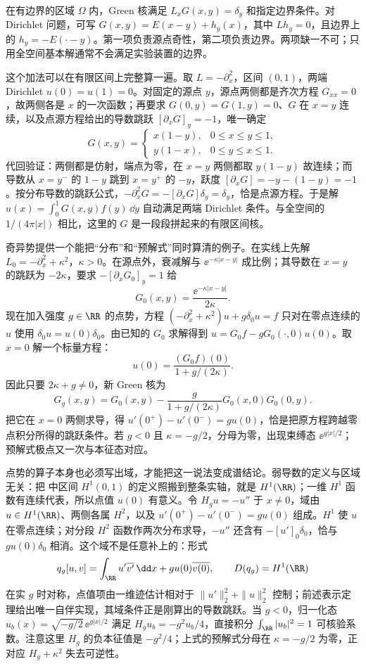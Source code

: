 在有边界的区域 \(\Omega\) 内，Green 核满足 \(L_xG(x,y)=\delta_y\) 和指定边界条件。对 Dirichlet 问题，可写 \(G(x,y)=E(x-y)+h_y(x)\)，其中 \(Lh_y=0\)，且边界上的 \(h_y=-E(\cdot-y)\)。第一项负责源点奇性，第二项负责边界。两项缺一不可；只用全空间基本解通常不会满足实验装置的边界。

这个加法可以在有限区间上完整算一遍。取 \(L=-\partial_x^2\)，区间 \((0,1)\)，两端 Dirichlet \(u(0)=u(1)=0\)。对固定的源点 \(y\)，源点两侧都是齐次方程 \(G_{xx}=0\)，故两侧各是 \(x\) 的一次函数；再要求 \(G(0,y)=G(1,y)=0\)、$G$ 在 $x=y$ 连续，以及点源方程给出的导数跳跃 $[\partial_xG]_y=-1$，唯一确定
\begin{equation}
 G(x,y)=
 \begin{cases}
 x(1-y),&0\le x\le y\le1,\\
 y(1-x),&0\le y\le x\le1.
 \end{cases}
 \label{eq:math-dirichlet-green-01}
\end{equation}
代回验证：两侧都是仿射，端点为零，在 \(x=y\) 两侧都取 \(y(1-y)\) 故连续；而导数从 \(x=y^{-}\) 的 \(1-y\) 跳到 \(x=y^{+}\) 的 \(-y\)，跃度 \([\partial_xG]=-y-(1-y)=-1\)。按分布导数的跳跃公式，\(-\partial_x^2G=-[\partial_xG]\delta_y=\delta_y\)，恰是点源方程。于是解 \(u(x)=\int_0^1G(x,y)f(y)\,\dd y\) 自动满足两端 Dirichlet 条件。与全空间的 \(1/(4\pi|x|)\) 相比，这里的 \(G\) 是一段段拼起来的有限区间核。

奇异势提供一个能把“分布”和“预解式”同时算清的例子。在实线上先解 \(L_0=-\partial_x^2+\kappa^2\)，\(\kappa>0\)。在源点外，衰减解与 \(\ee^{-\kappa|x-y|}\) 成比例；其导数在 \(x=y\) 的跳跃为 \(-2\kappa\)，要求 \(-[\partial_xG_0]_{y}=1\) 给
\[
G_0(x,y)=\frac{\ee^{-\kappa|x-y|}}{2\kappa}.
\]
现在加入强度 \(g\in\RR\) 的点势，方程 \((-\partial_x^2+\kappa^2)u+g\delta_0u=f\) 只对在零点连续的 \(u\) 使用 \(\delta_0u=u(0)\delta_0\)。由已知的 \(G_0\) 求解得到 \(u=G_0f-gG_0(\cdot,0)u(0)\)。取 \(x=0\) 解一个标量方程：
\[
u(0)=\frac{(G_0f)(0)}{1+g/(2\kappa)}.
\]
因此只要 \(2\kappa+g\ne0\)，新 Green 核为
\[
G_g(x,y)=G_0(x,y)-\frac{g}{1+g/(2\kappa)}G_0(x,0)G_0(0,y).
\]
把它在 \(x=0\) 两侧求导，得 \(u'(0^+)-u'(0^-)=g u(0)\)，恰是把原方程跨越零点积分所得的跳跃条件。若 \(g<0\) 且 \(\kappa=-g/2\)，分母为零，出现束缚态 \(\ee^{g|x|/2}\)；预解式极点又一次与本征态对应。

点势的算子本身也必须写出域，才能把这一说法变成谱结论。弱导数的定义与区域无关：把 中区间 \(H^1(0,1)\) 的定义照搬到整条实轴，就是 \(H^1(\RR)\)；一维 \(H^1\) 函数有连续代表，所以点值 \(u(0)\) 有意义。令 \(H_g u=-u''\) 于 \(x\ne0\)，域由 \(u\in H^1(\RR)\)、两侧各属 \(H^2\)，以及 \(u'(0^+)-u'(0^-)=g u(0)\) 组成。\(H^1\) 使 \(u\) 在零点连续；对分段 \(H^2\) 函数作两次分布求导，\(-u''\) 还含有 \(-[u']_0\delta_0\)，恰与 \(g u(0)\delta_0\) 相消。这个域不是任意补上的：形式
\[
 q_g[u,v]=\int_{\RR}u'\overline{v'}\,\dd x
   +g u(0)\overline{v(0)},\qquad D(q_g)=H^1(\RR)
\]
在实 \(g\) 时对称，点值项由一维迹估计相对于 \(\|u'\|_2^2+\|u\|_2^2\) 控制；前述表示定理给出唯一自伴实现，其域条件正是刚算出的导数跳跃。当 \(g<0\)，归一化态 \(u_b(x)=\sqrt{-g/2}\,\ee^{g|x|/2}\) 满足 \(H_gu_b=-g^2u_b/4\)，直接积分 \(\int_{\RR}|u_b|^2=1\) 可核验系数。注意这里 \(H_g\) 的负本征值是 \(-g^2/4\)；上式的预解式分母在 \(\kappa=-g/2\) 为零，正对应 \(H_g+\kappa^2\) 失去可逆性。



